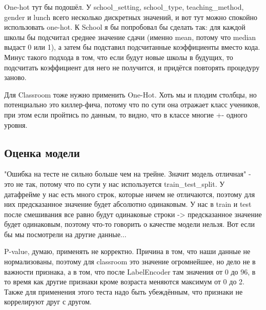 One-hot тут бы подошёл. У school\_setting, school\_type, teaching\_method, gender и lunch всего несколько дискретных значений, и вот тут можно спокойно использовать one-hot. К School я бы попробовал бы сделать так: для каждой школы бы подсчитал среднее значение сдачи (именно mean, потому что median выдаст 0 или 1), а затем бы подставил подсчитанные коэффициенты вместо кода. Минус такого подхода в том, что если будут новые школы в будущих, то подсчитать коэффициент для него не получится, и придётся повторять процедуру заново.

Для Classroom тоже нужно применить One-Hot. Хоть мы и плодим столбцы, но потенциально это киллер-фича, потому что по сути она отражает класс учеников, при этом если пройтись по данным, то видно, что в классе многие +- одного уровня.

\subsection*{Оценка модели}
"Ошибка на тесте не сильно больше чем на трейне. Значит модель отличная" - это не так, потому что по сути у нас используется train\_test\_split. У датафрейме у нас есть много строк, которые ничем не отличаются, поэтому для них предсказанное значение будет абсолютно одинаковым. У нас в train и test после смешивания все равно будут одинаковые строки -> предсказанное значение будет одинаковым, поэтому что-то говорить о качестве модели нельзя. Вот если бы мы посмотрели на другие данные...


P-value, думаю, применять не корректно. Причина в том, что наши данные не нормализованы, поэтому для classroom это значение огромнейшее, но дело не в важности признака, а в том, что после LabelEncoder там значения от 0 до 96, в то время как другие признаки кроме возраста меняются максимум от 0 до 2. Также для применения этого теста надо быть убеждённым, что признаки не коррелируют друг с другом.

